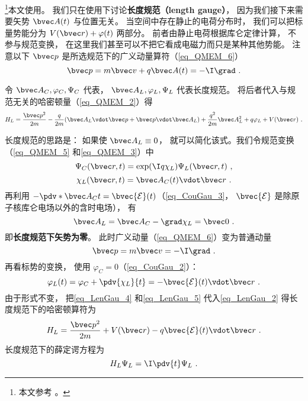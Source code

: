 

\footnote{本文参考 \cite{Bransden}。}本文使用。 我们只在使用下讨论\textbf{长度规范（length gauge）}， 因为我们接下来需要矢势 $\bvec A(t)$ 与位置无关。 当空间中存在静止的电荷分布时， 我们可以把标量势能分为 $V(\bvec r) + \varphi(t)$ 两部分。 前者由静止电荷根据库仑定律计算， 不参与规范变换， 在这里我们甚至可以不把它看成电磁力而只是某种其他势能。
注意以下 $\bvec p$ 是所选规范下的广义动量算符（\autoref{eq_QMEM_6}）
\begin{equation}
\bvec p = m \bvec v + q\bvec A(t) = -\I \grad~.
\end{equation}

令 $\bvec A_C, \varphi_C, \Psi_C$ 代表， $\bvec A_L, \varphi_L, \Psi_L$ 代表长度规范。 将后者代入与规范无关的哈密顿量（\autoref{eq_QMEM_2}）得
\begin{equation}\label{eq_LenGau_2}
H_L = \frac{\bvec p^2}{2m} - \frac{q}{2m} (\bvec A_L \vdot \bvec p + \bvec p \vdot \bvec A_L) + \frac{q^2}{2m} \bvec A_L^2 + q \varphi_L + V(\bvec r)~.
\end{equation}


长度规范的思路是： 如果使 $\bvec A_L \equiv 0$， 就可以简化该式。我们令规范变换（\autoref{eq_QMEM_5} 和\autoref{eq_QMEM_3}）中
\begin{equation}\label{eq_LenGau_1}
\Psi_C(\bvec r, t) = \exp(\I q\chi_L)\Psi_L(\bvec r, t)~,
\end{equation}
\begin{equation}
\chi_L(\bvec r, t) = \bvec A_C(t) \vdot \bvec r~.
\end{equation}
再利用 $-\pdv*{\bvec A_C}{t} = \bvec {\mathcal E}(t)$（\autoref{eq_CouGau_3}， $\bvec {\mathcal E}$ 是除原子核库仑电场以外的含时电场）， 有
\begin{equation}\label{eq_LenGau_4}
\bvec A_L = \bvec A_C - \grad \chi_L = \bvec 0~.
\end{equation}
即\textbf{长度规范下矢势为零}。 此时广义动量（\autoref{eq_QMEM_6}）变为普通动量
\begin{equation}\label{eq_LenGau_6}
\bvec p = m \bvec v = -\I \grad~.
\end{equation}
再看标势的变换， 使用 $\varphi_C = 0$（\autoref{eq_CouGau_2}）：
\begin{equation}\label{eq_LenGau_5}
\varphi_L(t) = \varphi_C + \pdv{\chi_L}{t} = -\bvec {\mathcal E}(t) \vdot \bvec r~.
\end{equation}
由于形式不变， 把\autoref{eq_LenGau_4} 和\autoref{eq_LenGau_5} 代入\autoref{eq_LenGau_2} 得长度规范下的哈密顿算符为
\begin{equation}\label{eq_LenGau_7}
H_L = \frac{\bvec p^2}{2m} + V(\bvec r) - q\bvec{\mathcal{E}}(t) \vdot \bvec r~.
\end{equation}
长度规范下的薛定谔方程为
\begin{equation}\label{eq_LenGau_3}
H_L \Psi_L = \I \pdv{t} \Psi_L~.
\end{equation}
